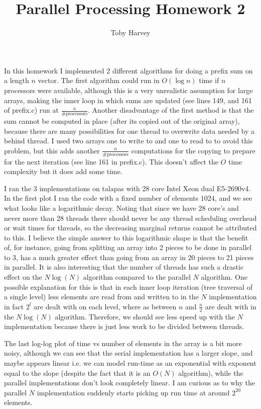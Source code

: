 \documentclass{article}
\begin{document}
\title{Parallel Processing Homework 2}
\author{Toby Harvey}
\maketitle


In this homework I implemented 2 different algorithms for doing a prefix sum on a length $n$ vector. The first algorithm could run in $O(\log n)$ time if $n$ processors were available, although this is a very unrealistic assumption for large arrays, making the inner loop in which sums are updated (see lines 149, and 161 of prefix.c) run at $\frac{n}{\# \text{processors}}$. Another disadvantage of the first method is that the sum cannot be computed in place (after its copied out of the original array), because there are many possibilities for one thread to overwrite data needed by a behind thread. I used two arrays one to write to and one to read to to avoid this problem, but this adds another $\frac{n}{\# \text{processors}}$ computations for the copying to prepare for the next iteration (see line 161 in prefix.c). This doesn't affect the $O$ time complexity but it does add some time.

I ran the 3 implementations on talapas with 28 core Intel Xeon dual E5-2690v4. In the first plot I ran the code with a fixed number of elements $1024$, and we see what looks like a logarithmic decay. Noting that since we have 28 core's and never more than 28 threads there should never be any thread scheduling overhead or wait times for threads, so the decreasing marginal returns cannot be attributed to this. I believe the simple answer to this logarithmic shape is that the benefit of, for instance, going from splitting an array into 2 pieces to be done in parallel to 3, has a much greater effect than going from an array in 20 pieces to 21 pieces in parallel. It is also interesting that the number of threads has such a drastic effect on the $N\log(N)$ algorithm compared to the parallel $N$ algorithm. One possible explanation for this is that in each inner loop iteration (tree traversal of a single level) less elements are read from and written to in the $N$ implementation in fact $2^l$ are dealt with on each level, where as between $n$ and $\frac{n}{2}$ are dealt with in the $N\log(N)$ algorithm. Therefore, we should see less speed up with the $N$ implementation because there is just less work to be divided between threads.

The last log-log plot of time vs number of elements in the array is a bit more noisy, although we can see that the serial implementation has a larger slope, and maybe appears linear i.e. we can model run-time as an exponential with exponent equal to the slope (despite the fact that it is an $O(N)$ algorithm), while the parallel implementations don't look completely linear. I am curious as to why the parallel $N$ implementation suddenly starts picking up run time at around $2^{20}$ elements.
\end{document}
